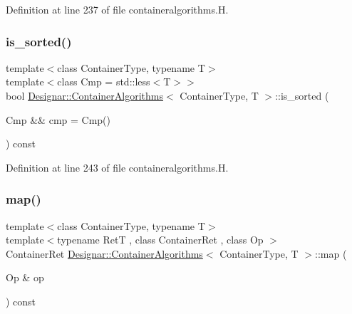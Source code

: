 Definition at line 237 of file containeralgorithms.\+H.

\mbox{\label{class_designar_1_1_container_algorithms_ae0960afa05917d880b2d7e0f61620f9d}} 
\subsubsection{\texorpdfstring{is\+\_\+sorted()}{is\_sorted()}\hspace{0.1cm}{\footnotesize\ttfamily [2/2]}}
{\footnotesize\ttfamily template$<$class Container\+Type, typename T$>$ \\
template$<$class Cmp  = std\+::less$<$\+T$>$$>$ \\
bool \hyperlink{class_designar_1_1_container_algorithms}{Designar\+::\+Container\+Algorithms}$<$ Container\+Type, T $>$\+::is\+\_\+sorted (\begin{DoxyParamCaption}\item[{Cmp \&\&}]{cmp = {\ttfamily Cmp()} }\end{DoxyParamCaption}) const\hspace{0.3cm}{\ttfamily [inline]}}



Definition at line 243 of file containeralgorithms.\+H.

\mbox{\label{class_designar_1_1_container_algorithms_a3b9044a197e4ceec6a1de03de197a293}} 
\subsubsection{\texorpdfstring{map()}{map()}\hspace{0.1cm}{\footnotesize\ttfamily [1/2]}}
{\footnotesize\ttfamily template$<$class Container\+Type, typename T$>$ \\
template$<$typename RetT , class Container\+Ret , class Op $>$ \\
Container\+Ret \hyperlink{class_designar_1_1_container_algorithms}{Designar\+::\+Container\+Algorithms}$<$ Container\+Type, T $>$\+::map (\begin{DoxyParamCaption}\item[{Op \&}]{op }\end{DoxyParamCaption}) const\hspace{0.3cm}{\ttfamily [inline]}}



